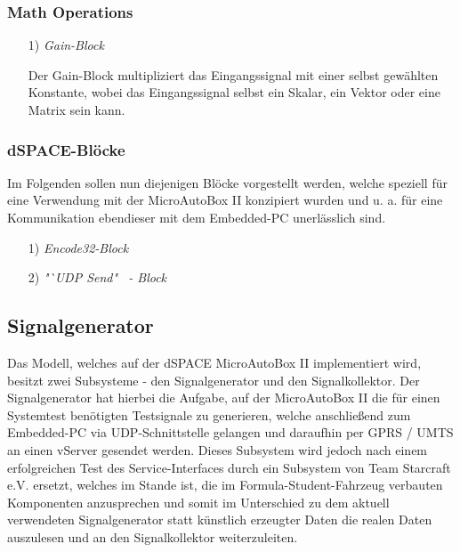 \documentclass[fontsize = 12pt, paper = a4]{scrreprt}
\begin{document}
\subsubsection{Math Operations}


\begin{itemize}

\item[1)] \textit{Gain-Block}

Der Gain-Block multipliziert das Eingangssignal mit einer selbst gewählten Konstante, wobei das Eingangssignal selbst ein Skalar, ein Vektor oder eine Matrix sein kann.


\end{itemize}

\subsubsection{dSPACE-Blöcke}

Im Folgenden sollen nun diejenigen Blöcke vorgestellt werden, welche speziell für eine Verwendung mit der MicroAutoBox II konzipiert wurden und u. a. für eine Kommunikation ebendieser mit dem Embedded-PC unerlässlich sind. 

\begin{itemize}

\item[1)] \textit{Encode32-Block}

\item[2)] \textit{"`UDP Send" \ - Block} 

\end{itemize}

\subsection{Signalgenerator}

Das Modell, welches auf der dSPACE MicroAutoBox II implementiert wird, besitzt zwei Subsysteme - den Signalgenerator und den Signalkollektor. Der Signalgenerator hat hierbei die Aufgabe, auf der MicroAutoBox II die für einen Systemtest benötigten Testsignale zu generieren, welche anschließend zum Embedded-PC via UDP-Schnittstelle gelangen und daraufhin per GPRS / UMTS an einen vServer gesendet werden. Dieses Subsystem wird jedoch nach einem erfolgreichen Test des Service-Interfaces durch ein Subsystem von Team Starcraft e.V. ersetzt, welches im Stande ist, die im Formula-Student-Fahrzeug verbauten Komponenten anzusprechen und somit im Unterschied zu dem aktuell verwendeten Signalgenerator statt künstlich erzeugter Daten die realen Daten auszulesen und an den Signalkollektor weiterzuleiten.   
\end{document}
